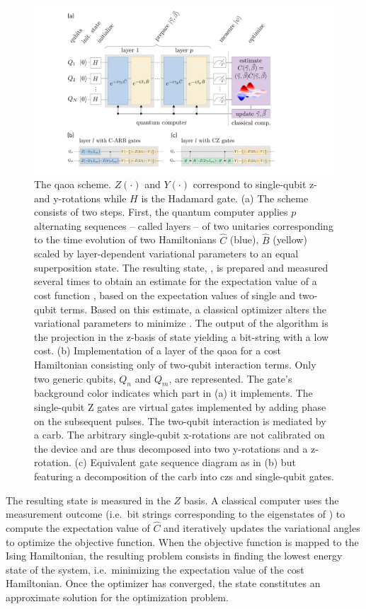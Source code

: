 \begin{figure}[H]
    \centering
    \includegraphics[width=\textwidth, trim ={9cm, 0 15cm, 0}]{chapters/qaoa/figs/qaoa_scheme-v6.pdf}
    \caption{The \gls{qaoa} scheme. $Z(\cdot)$ and $Y(\cdot)$ correspond to single-qubit z- and y-rotations while $H$ is the Hadamard gate. (a) The scheme consists of two steps. First, the quantum computer applies $p$ alternating sequences -- called layers -- of two unitaries corresponding to the time evolution of two Hamiltonians $\hat C$ (blue), $\hat B$ (yellow) scaled by layer-dependent variational parameters to an equal superposition state. The resulting state, \qaoaMeasuredState, is prepared and measured several times to obtain an estimate for the expectation value of a cost function \cost{}, based on the expectation values of single and two-qubit terms. Based on this estimate, a classical optimizer alters the variational parameters to minimize \cost{}. The output of the algorithm is the projection in the z-basis of state \optimalstate{} yielding a bit-string with a low cost. (b) Implementation of a layer of the \gls{qaoa} for a cost Hamiltonian consisting only of two-qubit interaction terms. Only two generic qubits, $Q_n$ and $Q_m$, are represented. The gate's background color indicates which part in (a) it implements. The single-qubit Z gates are virtual gates implemented by adding phase on the subsequent pulses. The two-qubit interaction is mediated by a \gls{carb}. The arbitrary single-qubit x-rotations are not calibrated on the device and are thus decomposed into two y-rotations and a z-rotation. (c) Equivalent gate sequence diagram as in (b) but featuring a decomposition of the \gls{carb} into \glspl{cz} and single-qubit gates.}
    \label{fig:qaoa_scheme}
\end{figure}

The resulting state \qaoaMeasuredState{} is measured in the $Z$ basis. A classical computer uses the measurement outcome (i.e.\ bit strings corresponding to the eigenstates of \qaoaMeasuredState{}) to compute the expectation value of $\hat C$ and iteratively updates the variational angles to optimize the objective function. When the objective function is mapped to the Ising Hamiltonian, the resulting problem consists in finding the lowest energy state of the system, i.e.\ minimizing the expectation value of the cost Hamiltonian. Once the optimizer has converged, the state \optimalstate{} constitutes an approximate solution for the optimization problem.

